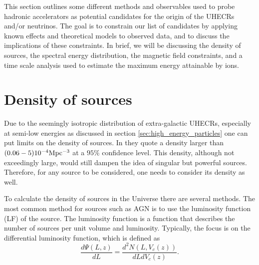 This section outlines some different methods and observables used to probe hadronic accelerators as potential candidates for the origin of the UHECRs and/or neutrinos. The goal is to constrain our list of candidates by applying known effects and theoretical models to observed data, and to discuss the implications of these constraints. In brief, we will be discussing the density of sources, the spectral energy distribution, the magnetic field constraints, and a time scale analysis used to estimate the maximum energy attainable by ions.

\section{Density of sources}
\label{sec:prevalence_of_sources}

Due to the seemingly isotropic distribution of extra-galactic UHECRs, especially at semi-low energies as discussed in section \ref{sec:high_energy_particles} one can put limits on the density of sources. In \cite{ThePierreAugercollaboration_2013} they quote a density larger than $(0.06-5) 10^{-4} \rm{Mpc^{-3}}$ at a $95\% $ confidence level. This density, although not exceedingly large, would still dampen the idea of singular but powerful sources. Therefore, for any source to be considered, one needs to consider its density as well. 

To calculate the density of sources in the Universe there are several methods. The most common method for sources such as AGN is to use the luminosity function (LF) of the source.
The luminosity function is a function that describes the number of sources per unit volume and luminosity. Typically, the focus is on the differential luminosity function, which is defined as
\begin{equation}
    \frac{d\Psi(L,z)}{dL} = \frac{d^2N(L,V_c(z))}{dLdV_c(z)}.
\end{equation}

